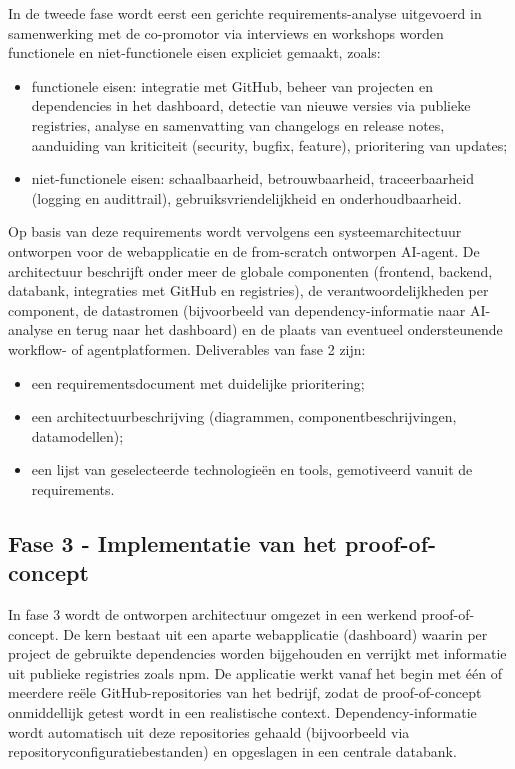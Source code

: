 In de tweede fase wordt eerst een gerichte requirements-analyse uitgevoerd in samenwerking met de co-promotor via interviews en workshops worden functionele en niet-functionele eisen expliciet gemaakt, zoals:
\begin{itemize}
  \item functionele eisen: integratie met GitHub, beheer van projecten en dependencies in het dashboard, detectie van nieuwe versies via publieke registries, analyse en samenvatting van changelogs en release notes, aanduiding van kriticiteit (security, bugfix, feature), prioritering van updates;
  \item niet-functionele eisen: schaalbaarheid, betrouwbaarheid, traceerbaarheid (logging en audittrail), gebruiksvriendelijkheid en onderhoudbaarheid.
\end{itemize}

Op basis van deze requirements wordt vervolgens een systeemarchitectuur ontworpen voor de webapplicatie en de from-scratch ontworpen AI-agent. De architectuur beschrijft onder meer de globale componenten (frontend, backend, databank, integraties met GitHub en registries), de verantwoordelijkheden per component, de datastromen (bijvoorbeeld van dependency-informatie naar AI-analyse en terug naar het dashboard) en de plaats van eventueel ondersteunende workflow- of agentplatformen. Deliverables van fase 2 zijn:
\begin{itemize}
  \item een requirementsdocument met duidelijke prioritering;
  \item een architectuurbeschrijving (diagrammen, componentbeschrijvingen, datamodellen);
  \item een lijst van geselecteerde technologieën en tools, gemotiveerd vanuit de requirements.
\end{itemize}

\subsection{Fase 3 - Implementatie van het proof-of-concept}
\label{sec:fase3}

In fase 3 wordt de ontworpen architectuur omgezet in een werkend proof-of-concept. De kern bestaat uit een aparte webapplicatie (dashboard) waarin per project de gebruikte dependencies worden bijgehouden en verrijkt met informatie uit publieke registries zoals npm. De applicatie werkt vanaf het begin met één of meerdere reële GitHub-repositories van het bedrijf, zodat de proof-of-concept onmiddellijk getest wordt in een realistische context. Dependency-informatie wordt automatisch uit deze repositories gehaald (bijvoorbeeld via repositoryconfiguratiebestanden) en opgeslagen in een centrale databank.

